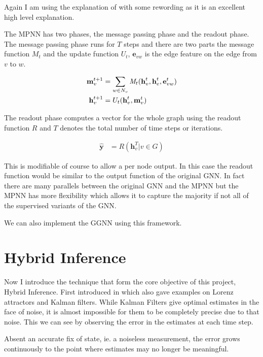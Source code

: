 \documentclass[]{../resources/final_report}
\begin{document}
Again I am using the explanation of \cite{graphoverview} with some rewording as it is an excellent high level explanation.

The MPNN has two phases, the message passing phase and the readout phase. The message passing phase runs for $T$ steps and there are two parts 
the message function $M_t$ and the update function $U_t$, $\textbf{e}_{vw}$ is the edge feature on the edge from $v$ to $w$.

\begin{align}
  \textbf{m}^{t+1}_v &= \sum_{w \in N_v} \emph{M}_t(\textbf{h}^t_v, \textbf{h}^t_e, \textbf{e}^t_{vw})\\
  \textbf{h}^{t+1}_v &= U_t(\textbf{h}^t_v, \textbf{m}^t_v)
\end{align}

The readout phase computes a vector for the whole graph using the readout function $R$ and $T$ denotes the total number of time steps or iterations.

\begin{align}
  \hat{\textbf{y}} &= R({\textbf{h}^T_v | v \in G})
\end{align}

This is modifiable of course to allow a per node output. In this case the readout function would be 
similar to the output function of the original GNN. In fact there are many parallels between the 
original GNN and the MPNN but the MPNN has more flexibility which allows it to capture 
the majority if not all of the supervised variants of the GNN.

We can also implement the GGNN using this framework.


\section{Hybrid Inference}

Now I introduce the technique that form the core objective of this project, Hybrid Inference. First 
introduced in \cite{Satorras2019CombiningGA} which also gave examples on Lorenz attractors and 
Kalman filters. While Kalman Filters give optimal estimates in the face of noise, it is almost 
impossible for them to be completely precise due to that noise. This we can see by observing the 
error in the estimates at each time step.

Absent an accurate fix of state, ie. a noiseless measurement, the error grows 
continuously to the point where estimates may no longer be meaningful.
\end{document}
